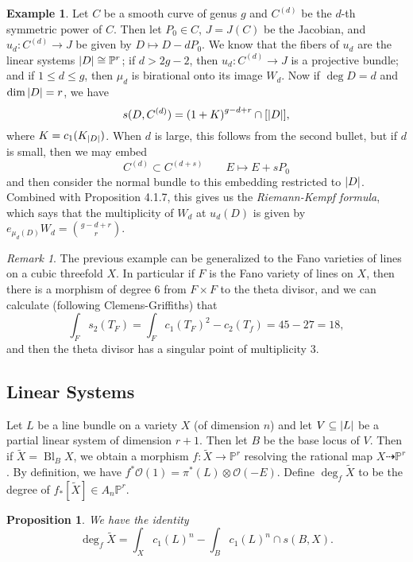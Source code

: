 \documentclass[leqno, openany]{memoir}
\newtheorem{prop}[thm]{Proposition}
\theoremstyle{definition}
\newtheorem{exm}[thm]{Example}
\theoremstyle{remark}
\newtheorem{rmk}[thm]{Remark}
\theoremstyle{plain}
\theoremstyle{definition}
\theoremstyle{remark}
\renewcommand{\P}{\mathbb{P}}
\newcommand{\mc}[1]{\mathcal{#1}}
\newcommand{\wt}[1]{\widetilde{#1}}
\DeclareMathOperator{\Bl}{Bl}
\begin{document}
\begin{exm}
    Let $C$ be a smooth curve of genus $g$ and $C^{(d)}$ be the $d$-th symmetric power of $C$. Then let $P_0 \in C$, $J = J(C)$ be the Jacobian, and $u_d \colon C^{(d)} \to J$ be given by $D \mapsto D - d P_0$. We know that the fibers of $u_d$ are the linear systems $\abs{D} \cong \P^r$; if $d > 2g-2$, then $u_d \colon C^{(d)} \to J$ is a projective bundle; and if $1 \leq d \leq g$, then $\mu_d$ is birational onto its image $W_d$.
    Now if $\deg D = d$ and $\dim \abs{D} = r$, we have
    \[ s(D, C^{(d)}) = {(1 + K)}^{g-d+r} \cap [\abs{D}], \]
    where $K = c_1(K_{\abs{D}})$. When $d$ is large, this follows from the second bullet, but if $d$ is small, then we may embed 
    \[ C^{(d)} \subset C^{(d+s)} \qquad E \mapsto E + s P_0 \]
    and then consider the normal bundle to this embedding restricted to $\abs{D}$. Combined with Proposition 4.1.7, this gives us the \textit{Riemann-Kempf formula}, which says that the multiplicity of $W_d$ at $u_d(D)$ is given by $e_{\mu_d(D)} W_d = \binom{g - d+r}{r}$.
\end{exm}

\begin{rmk}
    The previous example can be generalized to the Fano varieties of lines on a cubic threefold $X$. In particular if $F$ is the Fano variety of lines on $X$, then there is a morphism of degree $6$ from $F \times F$ to the theta divisor, and we can calculate (following Clemens-Griffiths) that
    \[ \int_F s_2(T_F) = \int_F {c_1(T_F)}^2 - c_2(T_f) = 45 - 27 = 18, \]
    and then the theta divisor has a singular point of multiplicity $3$.
\end{rmk}

\subsection{Linear Systems}%
\label{sub:linear_systems}

Let $L$ be a line bundle on a variety $X$ (of dimension $n$) and let $V \subseteq \abs{L}$ be a partial linear system of dimension $r+1$. Then let $B$ be the base locus of $V$. Then if $\wt{X} = \Bl_B X$, we obtain a morphism $f \colon \wt{X} \to \P^r$ resolving the rational map $X \dashrightarrow \P^r$. By definition, we have $f^* \mc{O}(1) = \pi^*(L) \otimes \mc{O}(-E)$. Define $\deg_f \wt{X}$ to be the degree of $f_* [\wt{X}] \in A_n \P^r$.

\begin{prop}
    We have the identity
    \[ \deg_f \wt{X} = \int_X {c_1(L)}^n - \int_B {c_1(L)}^n \cap s(B,X). \]
\end{prop}
\end{document}
